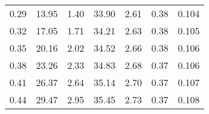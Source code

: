 \begin{tabular}{@{}ccccccc@{}}
0.29 & 13.95                                                                          & 1.40                                                          & 33.90                                                                     & 2.61                                                                        & 0.38                                                                       & 0.104                                                                   \\
0.32 & 17.05                                                                          & 1.71                                                          & 34.21                                                                     & 2.63                                                                        & 0.38                                                                       & 0.105                                                                   \\
0.35 & 20.16                                                                          & 2.02                                                          & 34.52                                                                     & 2.66                                                                        & 0.38                                                                       & 0.106                                                                   \\
0.38 & 23.26                                                                          & 2.33                                                          & 34.83                                                                     & 2.68                                                                        & 0.37                                                                       & 0.106                                                                   \\
0.41 & 26.37                                                                          & 2.64                                                          & 35.14                                                                     & 2.70                                                                        & 0.37                                                                       & 0.107                                                                   \\
0.44 & 29.47                                                                          & 2.95                                                          & 35.45                                                                     & 2.73                                                                        & 0.37                                                                       & 0.108                                                                   \\

\end{tabular}
